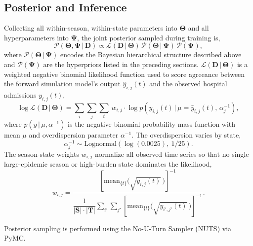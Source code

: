 \documentclass[11pt]{article}
\newcommand{\given}{\,|\,}
\newcommand{\Lognormal}{\text{Lognormal}}
\begin{document}
\subsection*{Posterior and Inference}
 
Collecting all within-season, within-state parameters into $\bm{\Theta}$ and all hyperparameters into $\bm{\Psi}$, the joint posterior sampled during training is,
\begin{equation}
    \mathcal{P}(\bm{\Theta}, \bm{\Psi} \given \bm{D}) \propto \mathcal{L}(\bm{D} \given \bm{\Theta})\, \mathcal{P}(\bm{\Theta} \given \bm{\Psi})\, \mathcal{P}(\bm{\Psi}),
\end{equation}
where $\mathcal{P}(\bm{\Theta} \given \bm{\Psi})$ encodes the Bayesian hierarchical structure described above and $\mathcal{P}(\bm{\Psi})$ are the hyperpriors listed in the preceding sections. $\mathcal{L}(\bm{D} \given \bm{\Theta})$ is a weighted negative binomial likelihood function used to score agreeance between the forward simulation model's output $\hat{y}_{i,j}(t)$ and the observed hospital admissions $y_{i,j}(t)$,
\begin{equation}
    \log \mathcal{L}(\bm{D} \given \bm{\Theta}) = \sum_{i}\sum_{j}\sum_{t}\, w_{i,j} \cdot \log p \!\left(y_{i,j}(t) \given \mu = \hat{y}_{i,j}(t),\, \alpha^{-1}_{j}\right),
\end{equation}
where $p(y \given \mu, \alpha^{-1})$ is the negative binomial probability mass function with mean $\mu$ and overdispersion parameter $\alpha^{-1}$. The overdispersion varies by state,
\begin{equation}
    \alpha^{-1}_j \sim \Lognormal\!\left(\log(0.0025),\ 1/25\right).
\end{equation}
The season-state weights $w_{i,j}$ normalize all observed time series so that no single large-epidemic season or high-burden state dominates the likelihood,
\begin{equation}
    w_{i,j} = \frac{\left[ \text{mean}_{\{t\}} \big( \sqrt{y_{i,j}(t)}\, \big) \right]^{-1}}{\dfrac{1}{|\bm{S}| \cdot |\bm{T}|} \displaystyle\sum_{i'}\sum_{j'}  \left[ \text{mean}_{\{t\}} \big( \sqrt{y_{i',j'}(t)}\, \big) \right]^{-1}}.
\end{equation}

 Posterior sampling is performed using the No-U-Turn Sampler (NUTS) via PyMC.
 
\end{document}
